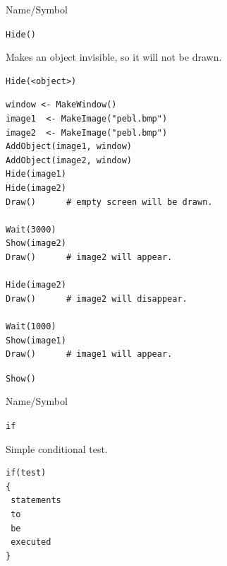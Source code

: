 \vfill
\newpage
{}
\vfill


\begin{desc}{Name/Symbol}
\item[Name/Symbol]	\verb+Hide()+ 

\item[Description]	Makes an object invisible, so it will not be drawn.

\item[Usage]
\begin{verbatim}
Hide(<object>)
\end{verbatim}

\item[Example]
\begin{verbatim}
window <- MakeWindow()
image1  <- MakeImage("pebl.bmp")
image2  <- MakeImage("pebl.bmp")
AddObject(image1, window)
AddObject(image2, window)
Hide(image1)
Hide(image2)
Draw()		# empty screen will be drawn.
	
Wait(3000)
Show(image2)
Draw()		# image2 will appear.

Hide(image2)
Draw()		# image2 will disappear.

Wait(1000)
Show(image1)
Draw()		# image1 will appear.
\end{verbatim}
 
\item[See Also]	\verb+Show()+
\end{desc}

\vfill
\newpage
{}
\vfill


\begin{desc}{Name/Symbol}
\item[Name/Symbol]	\verb+if+ 

\item[Description]	Simple conditional test.

\item[Usage]
\begin{verbatim}
if(test)
{
 statements
 to
 be 
 executed
}
\end{verbatim}

\item[Example]	

\item[See Also]	
\end{desc}

\vfill

